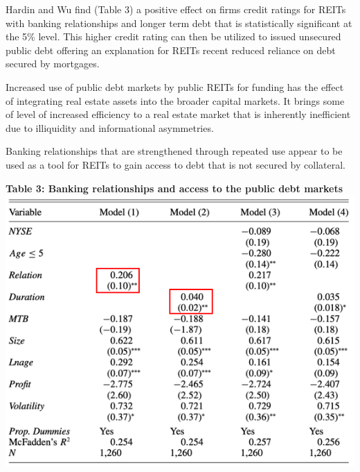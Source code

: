 \documentclass[a4paper, 12pt]{article} %
\begin{document}
Hardin and Wu find (Table 3) a positive effect on firms credit ratings for REITs with banking relationships and longer term debt that is statistically significant at the 5\% level. This higher credit rating can then be utilized to issued unsecured public debt offering an explanation for REITs recent reduced reliance on debt secured by mortgages.

Increased use of public debt markets by public REITs for funding has the effect of integrating real estate assets into the broader capital markets. It brings some of level of increased efficiency to a real estate market that is inherently inefficient due to illiquidity and informational asymmetries.

Banking relationships that are strengthened through repeated use appear to be used as a tool for REITs to gain access to debt that is not secured by collateral.

\begin{center}
\textbf{Table 3: Banking relationships and access to the public debt markets}
\includegraphics[width=1\textwidth]{Table_III.png}

\end{center}
\end{document}
